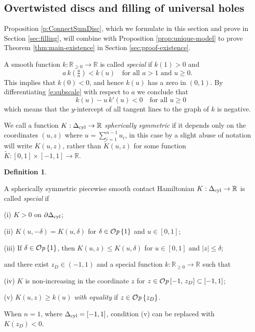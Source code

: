 \documentclass[12pt]{paper}
\theoremstyle{plain}
\theoremstyle{definition}
\newtheorem{definition}[theorem]{Definition}
\newcommand{\wt}{\widetilde}
\newcommand{\p}{\partial}
\newcommand{\abs}[1]{\left| #1 \right|}
\newcommand{\R}{{\mathbb{R}}}
\newcommand{\cyl}{{\rm cyl}}
\def\Op{{\mathcal O}{\it p}\,}
\numberwithin{figure}{section}
\begin{document}
\subsection{Overtwisted discs and filling of universal holes}\label{sec:ot-disc}
Proposition \ref{p:ConnectSumDisc}, which we formulate in this section and prove in Section \ref{sec:filling},
will combine with Proposition \ref{prop:unique-model} to prove Theorem \ref{thm:main-existence} in Section \ref{sec:proof-existence}.
 
A smooth function $k: \R_{\geq 0} \to \R$  is called  \emph{special} if $k(1)>0$ and 
\begin{equation}\label{e:subscale}
	a\,k\left(\tfrac{u}{a}\right) < k(u) \quad\mbox{for all $a > 1$ and $u \geq 0$.}
\end{equation}
This implies that   $k(0)<0$, and hence $k(u)$ has a zero in $(0, 1)$.
By differentiating \eqref{e:subscale} with respect to $a$ we conclude that
\begin{equation}\label{e:specialCon}
	\quad k(u) - u\,k'(u) < 0 \quad\mbox{for all $u \geq 0$} 
\end{equation}
which means that  the $y$-intercept of all  tangent lines  to the graph of $k$ is negative. 


We call  a function $K:\Delta_\cyl\to\R$ {\em spherically symmetric} if it depends only on the coordinates $(u, z)$ where
$u=\sum_{i=1}^{n-1}u_i$, in this case by a slight abuse of notation  will write $K(u,z)$, rather than   $\wt K(u,z)$ for some function 
$\wt K:[0,1]\times[-1,1]\to \R$.

\begin{definition}\label{def:SpecialHam}
 
A spherically symmetric piecewise smooth contact Hamiltonian $K: \Delta_\cyl \to \R$
is  called {\em special} if  
\begin{description}
\item{(i)}  $K > 0$ on $\p\Delta_{\cyl}$;
\item{(ii)} $K(u,-\delta)=K(u,\delta)$ for $\delta \in \Op \{1\}$ and $u \in [0,1]$;
\item{(iii)} If $\delta \in \Op\{1\}$, then $K(u,z)\leq K(u,\delta)$ for  $u\in[0,1]$ and $\abs{z} \leq \delta$;
\end{description} and
   there exist $z_D \in (-1, 1)$ and a  special function $k: \R_{\geq 0} \to \R$ such that
\begin{description}
 \item{(iv)} $K$ is non-increasing in the coordinate $z$ for $z\in\Op [-1,\,z_D]\subset[-1,1]$;
\item{(v)} $K(u,z) \geq k (u)$ {\em with equality} if $z \in \Op\{ z_D\}$. 
\end{description}
 
When $n=1$, where $\Delta_\cyl = [-1,1]$, condition (v) can be replaced with $K(z_D) < 0$.
\end{definition}
 
\end{document}
